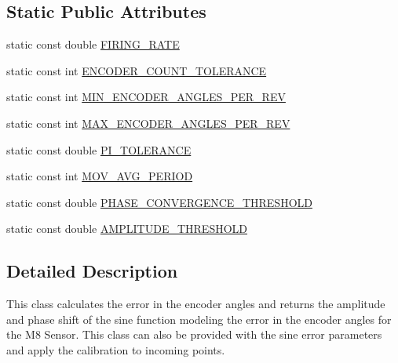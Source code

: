 \subsection*{Static Public Attributes}
\begin{DoxyCompactItemize}
\item 
static const double \hyperlink{structquanergy_1_1calibration_1_1EncoderAngleCalibration_a76aedeeacc4ac54b5fa1324a144abaf6}{F\-I\-R\-I\-N\-G\-\_\-\-R\-A\-T\-E}
\item 
static const int \hyperlink{structquanergy_1_1calibration_1_1EncoderAngleCalibration_a78466d125a2b3c71199e06bb8f433738}{E\-N\-C\-O\-D\-E\-R\-\_\-\-C\-O\-U\-N\-T\-\_\-\-T\-O\-L\-E\-R\-A\-N\-C\-E}
\item 
static const int \hyperlink{structquanergy_1_1calibration_1_1EncoderAngleCalibration_abe79c88a1e3a3e42796a225e34c1d67f}{M\-I\-N\-\_\-\-E\-N\-C\-O\-D\-E\-R\-\_\-\-A\-N\-G\-L\-E\-S\-\_\-\-P\-E\-R\-\_\-\-R\-E\-V}
\item 
static const int \hyperlink{structquanergy_1_1calibration_1_1EncoderAngleCalibration_ab42e578d8a1c168e7d75506faad03dc2}{M\-A\-X\-\_\-\-E\-N\-C\-O\-D\-E\-R\-\_\-\-A\-N\-G\-L\-E\-S\-\_\-\-P\-E\-R\-\_\-\-R\-E\-V}
\item 
static const double \hyperlink{structquanergy_1_1calibration_1_1EncoderAngleCalibration_a934b8f1f5c14ed61c7ba6bc5e01ddd5b}{P\-I\-\_\-\-T\-O\-L\-E\-R\-A\-N\-C\-E}
\item 
static const int \hyperlink{structquanergy_1_1calibration_1_1EncoderAngleCalibration_a0d42f1ff560d67d491511970960f0cfa}{M\-O\-V\-\_\-\-A\-V\-G\-\_\-\-P\-E\-R\-I\-O\-D}
\item 
static const double \hyperlink{structquanergy_1_1calibration_1_1EncoderAngleCalibration_a12436409c1f1f10f4c005e45fcfbfbf2}{P\-H\-A\-S\-E\-\_\-\-C\-O\-N\-V\-E\-R\-G\-E\-N\-C\-E\-\_\-\-T\-H\-R\-E\-S\-H\-O\-L\-D}
\item 
static const double \hyperlink{structquanergy_1_1calibration_1_1EncoderAngleCalibration_a1b9a418e7547fb16216a839a0f605b47}{A\-M\-P\-L\-I\-T\-U\-D\-E\-\_\-\-T\-H\-R\-E\-S\-H\-O\-L\-D}
\end{DoxyCompactItemize}


\subsection{Detailed Description}
This class calculates the error in the encoder angles and returns the amplitude and phase shift of the sine function modeling the error in the encoder angles for the M8 Sensor. This class can also be provided with the sine error parameters and apply the calibration to incoming points. 

